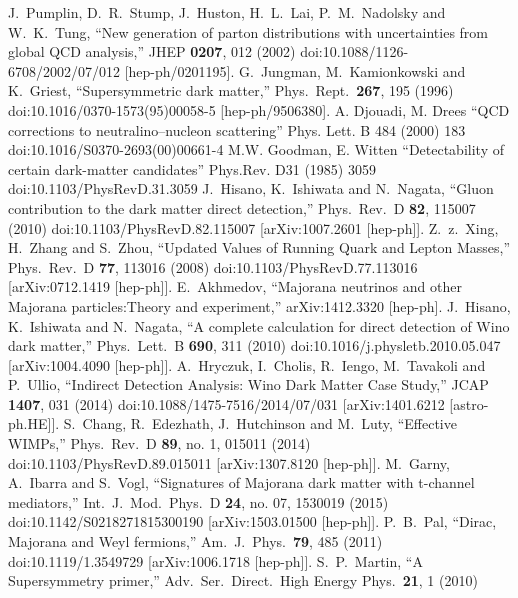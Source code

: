 \begin{thebibliography}{xxx}
    J.~Pumplin, D.~R.~Stump, J.~Huston, H.~L.~Lai, P.~M.~Nadolsky and W.~K.~Tung,
  ``New generation of parton distributions with uncertainties from global QCD analysis,''
  JHEP {\bf 0207}, 012 (2002)
  doi:10.1088/1126-6708/2002/07/012
  [hep-ph/0201195].
    G.~Jungman, M.~Kamionkowski and K.~Griest,
  ``Supersymmetric dark matter,''
  Phys.\ Rept.\  {\bf 267}, 195 (1996)
  doi:10.1016/0370-1573(95)00058-5
  [hep-ph/9506380]. 
  A. Djouadi, M. Drees ``QCD corrections to neutralino–nucleon scattering'' Phys. Lett. B 484 (2000) 183 doi:10.1016/S0370-2693(00)00661-4
 M.W. Goodman, E. Witten ``Detectability of certain dark-matter candidates'' Phys.Rev. D31 (1985) 3059 doi:10.1103/PhysRevD.31.3059
   J.~Hisano, K.~Ishiwata and N.~Nagata,
  ``Gluon contribution to the dark matter direct detection,''
  Phys.\ Rev.\ D {\bf 82}, 115007 (2010)
  doi:10.1103/PhysRevD.82.115007
  [arXiv:1007.2601 [hep-ph]].
    Z.~z.~Xing, H.~Zhang and S.~Zhou,
  ``Updated Values of Running Quark and Lepton Masses,''
  Phys.\ Rev.\ D {\bf 77}, 113016 (2008)
  doi:10.1103/PhysRevD.77.113016
  [arXiv:0712.1419 [hep-ph]].
    E.~Akhmedov,
  ``Majorana neutrinos and other Majorana particles:Theory and experiment,''
  arXiv:1412.3320 [hep-ph].
    J.~Hisano, K.~Ishiwata and N.~Nagata,
  ``A complete calculation for direct detection of Wino dark matter,''
  Phys.\ Lett.\ B {\bf 690}, 311 (2010)
  doi:10.1016/j.physletb.2010.05.047
  [arXiv:1004.4090 [hep-ph]].
    A.~Hryczuk, I.~Cholis, R.~Iengo, M.~Tavakoli and P.~Ullio,
  ``Indirect Detection Analysis: Wino Dark Matter Case Study,''
  JCAP {\bf 1407}, 031 (2014)
  doi:10.1088/1475-7516/2014/07/031
  [arXiv:1401.6212 [astro-ph.HE]].
    S.~Chang, R.~Edezhath, J.~Hutchinson and M.~Luty,
  ``Effective WIMPs,''
  Phys.\ Rev.\ D {\bf 89}, no. 1, 015011 (2014)
  doi:10.1103/PhysRevD.89.015011
  [arXiv:1307.8120 [hep-ph]].
    M.~Garny, A.~Ibarra and S.~Vogl,
  ``Signatures of Majorana dark matter with t-channel mediators,''
  Int.\ J.\ Mod.\ Phys.\ D {\bf 24}, no. 07, 1530019 (2015)
  doi:10.1142/S0218271815300190
  [arXiv:1503.01500 [hep-ph]].
    P.~B.~Pal,
  ``Dirac, Majorana and Weyl fermions,''
  Am.\ J.\ Phys.\  {\bf 79}, 485 (2011)
  doi:10.1119/1.3549729
  [arXiv:1006.1718 [hep-ph]].
    S.~P.~Martin,
  ``A Supersymmetry primer,''
  Adv.\ Ser.\ Direct.\ High Energy Phys.\  {\bf 21}, 1 (2010)

\end{thebibliography}
